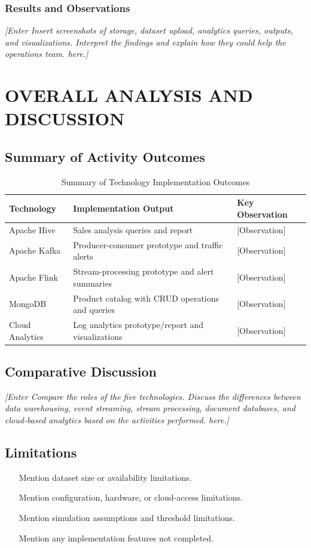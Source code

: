 \documentclass[12pt,a4paper]{report}
\newcommand{\placeholder}[1]{\textit{[Enter #1 here.]}}
\begin{document}
\subsection{Results and Observations}
\placeholder{Insert screenshots of storage, dataset upload, analytics
queries, outputs, and visualizations. Interpret the findings and explain
how they could help the operations team.}

\clearpage
\chapter{OVERALL ANALYSIS AND DISCUSSION}

\section{Summary of Activity Outcomes}
\begin{table}[H]
\centering
\caption{Summary of Technology Implementation Outcomes}
\begin{tabularx}{\textwidth}{|l|X|X|}
\hline
\textbf{Technology} & \textbf{Implementation Output} & \textbf{Key Observation}\\
\hline
Apache Hive & Sales analysis queries and report & [Observation]\\
\hline
Apache Kafka & Producer-consumer prototype and traffic alerts & [Observation]\\
\hline
Apache Flink & Stream-processing prototype and alert summaries & [Observation]\\
\hline
MongoDB & Product catalog with CRUD operations and queries & [Observation]\\
\hline
Cloud Analytics & Log analytics prototype/report and visualizations & [Observation]\\
\hline
\end{tabularx}
\end{table}

\section{Comparative Discussion}
\placeholder{Compare the roles of the five technologies. Discuss the
differences between data warehousing, event streaming, stream processing,
document databases, and cloud-based analytics based on the activities
performed.}

\section{Limitations}
\begin{itemize}
    \item [Mention dataset size or availability limitations.]
    \item [Mention configuration, hardware, or cloud-access limitations.]
    \item [Mention simulation assumptions and threshold limitations.]
    \item [Mention any implementation features not completed.]
\end{itemize}
\end{document}
